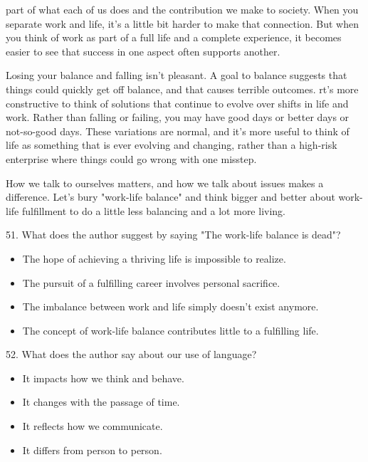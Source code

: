 \documentclass[UTF8,11pt]{ctexart}
\begin{document}
part of what each of us does and the contribution we make to society. When you separate work and life, it's a little bit harder to make that connection. But when you think of work as part of a full life and a complete experience, it becomes easier to see that success in one aspect often supports another.


Losing your balance and falling isn't pleasant. A goal to balance suggests that things could quickly get off balance, and that causes terrible outcomes. rt's more constructive to think of solutions that continue to evolve over shifts in life and work. Rather than falling or failing, you may have good days or better days or not-so-good days. These variations are normal, and it's more useful to think of life as something that is ever evolving and changing, rather than a high-risk enterprise where things could go wrong with one misstep.


How we talk to ourselves matters, and how we talk about issues makes a difference. Let's bury "work-life balance" and think bigger and better about work-life fulfillment to do a little less balancing and a lot more living.


51. What does the author suggest by saying "The work-life balance is dead"?


\begin{itemize}[leftmargin=2em,itemsep=.2em,topsep=.4em]\item[A.] The hope of achieving a thriving life is impossible to realize.
\item[B.] The pursuit of a fulfilling career involves personal sacrifice.
\item[C.] The imbalance between work and life simply doesn't exist anymore.
\item[D.] The concept of work-life balance contributes little to a fulfilling life.
\end{itemize}

52. What does the author say about our use of language?


\begin{itemize}[leftmargin=2em,itemsep=.2em,topsep=.4em]\item[A.] It impacts how we think and behave.
\item[B.] It changes with the passage of time.
\item[C.] It reflects how we communicate.
\item[D.] It differs from person to person.
\end{itemize}
\end{document}
